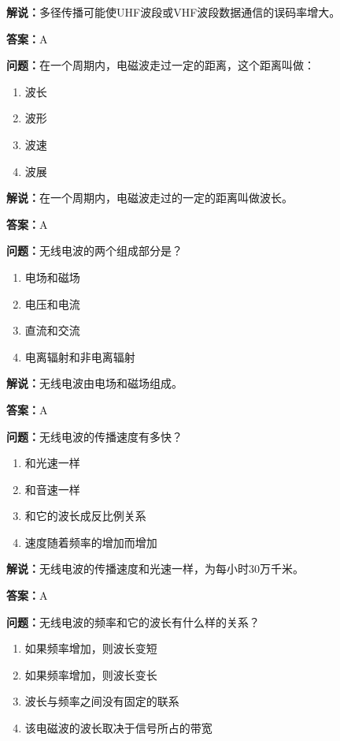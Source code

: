 \documentclass[UTF8]{ctexbook}
\begin{document}
\textbf{解说：}多径传播可能使UHF波段或VHF波段数据通信的误码率增大。%

\textbf{答案：}A

\textbf{问题：}在一个周期内，电磁波走过一定的距离，这个距离叫做：

\begin{enumerate}[label=\Alph*), leftmargin=3em]
  \item 波长
  \item 波形
  \item 波速
  \item 波展
\end{enumerate}

\textbf{解说：}在一个周期内，电磁波走过的一定的距离叫做波长。%

\textbf{答案：}A

\textbf{问题：}无线电波的两个组成部分是？

\begin{enumerate}[label=\Alph*), leftmargin=3em]
  \item 电场和磁场
  \item 电压和电流
  \item 直流和交流
  \item 电离辐射和非电离辐射
\end{enumerate}

\textbf{解说：}无线电波由电场和磁场组成。%

\textbf{答案：}A

\textbf{问题：}无线电波的传播速度有多快？

\begin{enumerate}[label=\Alph*), leftmargin=3em]
  \item 和光速一样
  \item 和音速一样
  \item 和它的波长成反比例关系
  \item 速度随着频率的增加而增加
\end{enumerate}

\textbf{解说：}无线电波的传播速度和光速一样，为每小时30万千米。

\textbf{答案：}A

\textbf{问题：}无线电波的频率和它的波长有什么样的关系？

\begin{enumerate}[label=\Alph*), leftmargin=3em]
  \item 如果频率增加，则波长变短
  \item 如果频率增加，则波长变长
  \item 波长与频率之间没有固定的联系
  \item 该电磁波的波长取决于信号所占的带宽
\end{enumerate}
\end{document}
